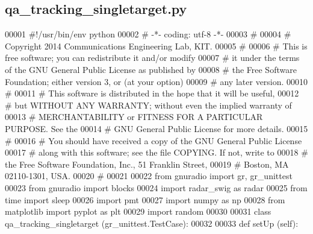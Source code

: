 \subsection{qa\+\_\+tracking\+\_\+singletarget.\+py}
\label{qa__tracking__singletarget_8py_source}

\begin{DoxyCode}
00001 \textcolor{comment}{#!/usr/bin/env python}
00002 \textcolor{comment}{# -*- coding: utf-8 -*-}
00003 \textcolor{comment}{# }
00004 \textcolor{comment}{# Copyright 2014 Communications Engineering Lab, KIT.}
00005 \textcolor{comment}{# }
00006 \textcolor{comment}{# This is free software; you can redistribute it and/or modify}
00007 \textcolor{comment}{# it under the terms of the GNU General Public License as published by}
00008 \textcolor{comment}{# the Free Software Foundation; either version 3, or (at your option)}
00009 \textcolor{comment}{# any later version.}
00010 \textcolor{comment}{# }
00011 \textcolor{comment}{# This software is distributed in the hope that it will be useful,}
00012 \textcolor{comment}{# but WITHOUT ANY WARRANTY; without even the implied warranty of}
00013 \textcolor{comment}{# MERCHANTABILITY or FITNESS FOR A PARTICULAR PURPOSE.  See the}
00014 \textcolor{comment}{# GNU General Public License for more details.}
00015 \textcolor{comment}{# }
00016 \textcolor{comment}{# You should have received a copy of the GNU General Public License}
00017 \textcolor{comment}{# along with this software; see the file COPYING.  If not, write to}
00018 \textcolor{comment}{# the Free Software Foundation, Inc., 51 Franklin Street,}
00019 \textcolor{comment}{# Boston, MA 02110-1301, USA.}
00020 \textcolor{comment}{# }
00021 
00022 \textcolor{keyword}{from} gnuradio \textcolor{keyword}{import} gr, gr\_unittest
00023 \textcolor{keyword}{from} gnuradio \textcolor{keyword}{import} blocks
00024 \textcolor{keyword}{import} radar\_swig \textcolor{keyword}{as} radar
00025 \textcolor{keyword}{from} time \textcolor{keyword}{import} sleep
00026 \textcolor{keyword}{import} pmt
00027 \textcolor{keyword}{import} numpy \textcolor{keyword}{as} np
00028 \textcolor{keyword}{from} matplotlib \textcolor{keyword}{import} pyplot \textcolor{keyword}{as} plt
00029 \textcolor{keyword}{import} random
00030 
00031 \textcolor{keyword}{class }qa_tracking_singletarget (gr\_unittest.TestCase):
00032 
00033     \textcolor{keyword}{def }setUp (self):

\end{DoxyCode}
